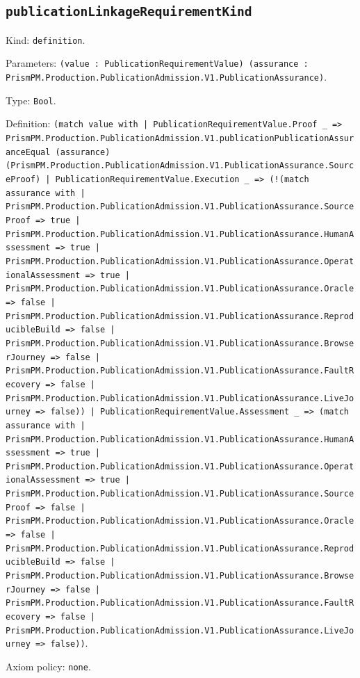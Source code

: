 \documentclass[11pt]{article}
\begin{document}
\subsection*{\texttt{publicationLinkageRequirementKind}}
\noindent Kind: \texttt{definition}.\par
\noindent Parameters: \texttt{(value : PublicationRequirementValue) (assurance : PrismPM.Production.PublicationAdmission.V1.PublicationAssurance)}.\par
\noindent Type: \texttt{Bool}.\par
\noindent Definition: \texttt{(match value with | PublicationRequirementValue.Proof \_ => PrismPM.Production.PublicationAdmission.V1.publicationPublicationAssuranceEqual (assurance) (PrismPM.Production.PublicationAdmission.V1.PublicationAssurance.SourceProof) | PublicationRequirementValue.Execution \_ => (!(match assurance with | PrismPM.Production.PublicationAdmission.V1.PublicationAssurance.SourceProof => true | PrismPM.Production.PublicationAdmission.V1.PublicationAssurance.HumanAssessment => true | PrismPM.Production.PublicationAdmission.V1.PublicationAssurance.OperationalAssessment => true | PrismPM.Production.PublicationAdmission.V1.PublicationAssurance.Oracle => false | PrismPM.Production.PublicationAdmission.V1.PublicationAssurance.ReproducibleBuild => false | PrismPM.Production.PublicationAdmission.V1.PublicationAssurance.BrowserJourney => false | PrismPM.Production.PublicationAdmission.V1.PublicationAssurance.FaultRecovery => false | PrismPM.Production.PublicationAdmission.V1.PublicationAssurance.LiveJourney => false)) | PublicationRequirementValue.Assessment \_ => (match assurance with | PrismPM.Production.PublicationAdmission.V1.PublicationAssurance.HumanAssessment => true | PrismPM.Production.PublicationAdmission.V1.PublicationAssurance.OperationalAssessment => true | PrismPM.Production.PublicationAdmission.V1.PublicationAssurance.SourceProof => false | PrismPM.Production.PublicationAdmission.V1.PublicationAssurance.Oracle => false | PrismPM.Production.PublicationAdmission.V1.PublicationAssurance.ReproducibleBuild => false | PrismPM.Production.PublicationAdmission.V1.PublicationAssurance.BrowserJourney => false | PrismPM.Production.PublicationAdmission.V1.PublicationAssurance.FaultRecovery => false | PrismPM.Production.PublicationAdmission.V1.PublicationAssurance.LiveJourney => false))}.\par
\noindent Axiom policy: \texttt{none}.\par
\end{document}
